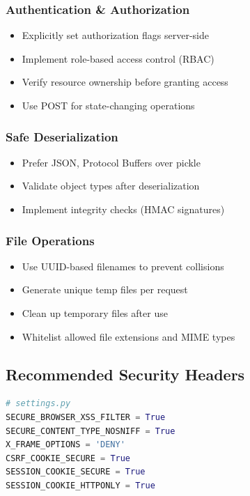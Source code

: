 \documentclass[12pt,a4paper]{article}
\begin{document}
\subsubsection{Authentication \& Authorization}
\begin{itemize}[leftmargin=*]
    \item Explicitly set authorization flags server-side
    \item Implement role-based access control (RBAC)
    \item Verify resource ownership before granting access
    \item Use POST for state-changing operations
\end{itemize}

\subsubsection{Safe Deserialization}
\begin{itemize}[leftmargin=*]
    \item Prefer JSON, Protocol Buffers over pickle
    \item Validate object types after deserialization
    \item Implement integrity checks (HMAC signatures)
\end{itemize}

\subsubsection{File Operations}
\begin{itemize}[leftmargin=*]
    \item Use UUID-based filenames to prevent collisions
    \item Generate unique temp files per request
    \item Clean up temporary files after use
    \item Whitelist allowed file extensions and MIME types
\end{itemize}

\subsection{Recommended Security Headers}

\begin{lstlisting}[language=Python]
# settings.py
SECURE_BROWSER_XSS_FILTER = True
SECURE_CONTENT_TYPE_NOSNIFF = True
X_FRAME_OPTIONS = 'DENY'
CSRF_COOKIE_SECURE = True
SESSION_COOKIE_SECURE = True
SESSION_COOKIE_HTTPONLY = True
\end{lstlisting}
\end{document}
